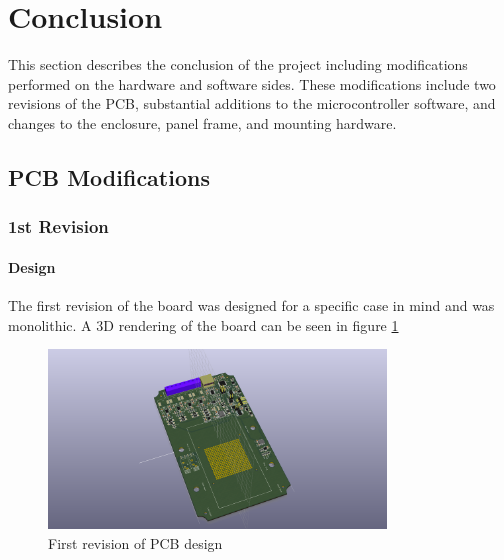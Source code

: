 \documentclass{article}
\numberwithin{figure}{section}
\numberwithin{equation}{section}
\begin{document}
{\section{Conclusion}\label{conclusion}
This section describes the conclusion of the project including modifications performed on the hardware and software sides. These modifications include two revisions of the PCB, substantial additions to the microcontroller software, and changes to the enclosure, panel frame, and mounting hardware.

\subsection{PCB Modifications}
\subsubsection{1st Revision}\label{conclusion-pcb-rev1}
\paragraph{Design}
The first revision of the board was designed for a specific case in mind and was monolithic. A 3D rendering of the board can be seen in figure \ref{fig:b1}
\begin{figure}[H]
	\centering
	\includegraphics[width=0.8\textwidth]{RFCxrev1_top}
	\caption{First revision of PCB design}
	\label{fig:b1}
\end{figure}

}
\end{document}
